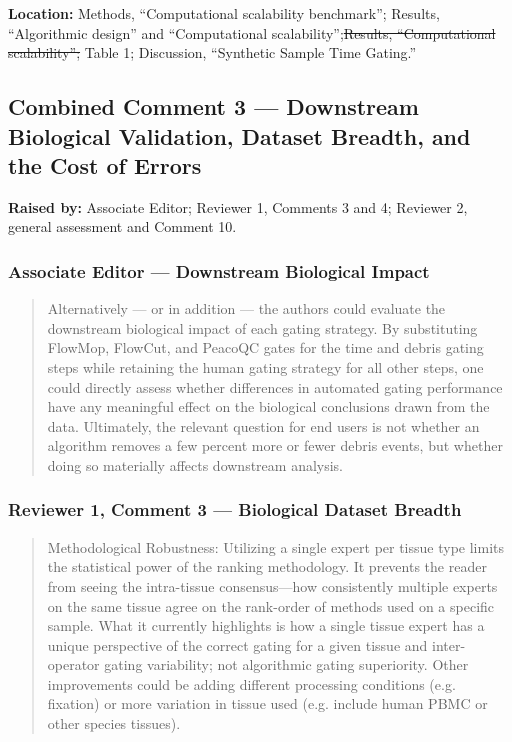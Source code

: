 \documentclass[
  11pt,
  a4paper,
]{article}
\begin{document}
\textbf{Location:} Methods, {\color{revisionblue}``Computational
scalability benchmark''; Results,} ``Algorithmic design'' and
``Computational scalability'';{\color{revisionred}\sout{Results,
``Computational scalability'';}} Table 1; Discussion, ``Synthetic Sample
Time Gating.''

\subsection{Combined Comment 3 --- Downstream Biological Validation,
Dataset Breadth, and the Cost of
Errors}\label{combined-comment-3--downstream-biological-validation-dataset-breadth-and-the-cost-of-errors}

\textbf{Raised by:} Associate Editor; Reviewer 1, Comments 3 and 4;
Reviewer 2, general assessment and Comment 10.

\subsubsection{Associate Editor --- Downstream Biological
Impact}\label{associate-editor--downstream-biological-impact}

\begin{quote}
Alternatively --- or in addition --- the authors could evaluate the
downstream biological impact of each gating strategy. By substituting
FlowMop, FlowCut, and PeacoQC gates for the time and debris gating steps
while retaining the human gating strategy for all other steps, one could
directly assess whether differences in automated gating performance have
any meaningful effect on the biological conclusions drawn from the data.
Ultimately, the relevant question for end users is not whether an
algorithm removes a few percent more or fewer debris events, but whether
doing so materially affects downstream analysis.
\end{quote}

\subsubsection{Reviewer 1, Comment 3 --- Biological Dataset
Breadth}\label{reviewer-1-comment-3--biological-dataset-breadth}

\begin{quote}
Methodological Robustness: Utilizing a single expert per tissue type
limits the statistical power of the ranking methodology. It prevents the
reader from seeing the intra-tissue consensus---how consistently
multiple experts on the same tissue agree on the rank-order of methods
used on a specific sample. What it currently highlights is how a single
tissue expert has a unique perspective of the correct gating for a given
tissue and inter-operator gating variability; not algorithmic gating
superiority. Other improvements could be adding different processing
conditions (e.g. fixation) or more variation in tissue used (e.g.
include human PBMC or other species\textquotesingle{} tissues).
\end{quote}
\end{document}
